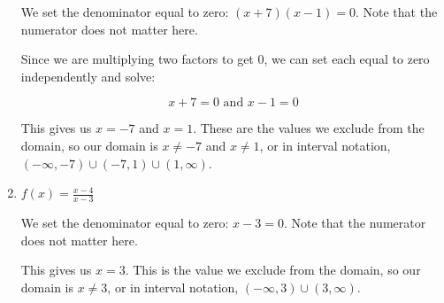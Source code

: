 \documentclass{ximera}
\begin{document}
\begin{enumerate}
\begin{explanation}
\begin{expandable}
We set the denominator equal to zero: $(x + 7)(x - 1) = 0$. Note that the numerator does not matter here. 

Since we are multiplying two factors to get 0, we can set each equal to zero independently and solve: 

$$x + 7 = 0 \text{ and } x - 1 = 0$$

This gives us $x = -7$ and $x = 1$. These are the values we exclude from the domain, so our domain is $x \ne -7$ and $x \ne 1$, or in interval notation, $(-\infty, -7) \cup (-7, 1) \cup (1, \infty)$. 
			\end{expandable}
		\end{explanation}
	\item $f(x) = \frac{x - 4}{x - 3}$
		\begin{explanation}
			\begin{expandable}

We set the denominator equal to zero: $x - 3 = 0$. Note that the numerator does not matter here. 

This gives us $x = 3$. This is the value we exclude from the domain, so our domain is $x \ne 3$, or in interval notation, $(-\infty, 3) \cup (3, \infty)$.
			\end{expandable} 
		\end{explanation}
\end{enumerate}



\end{document}
